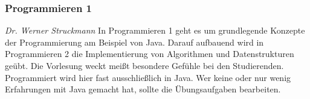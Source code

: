 
\subsubsection{Programmieren 1}
	\textit{Dr. Werner Struckmann}
	In Programmieren 1 geht es um grundlegende Konzepte der Programmierung am Beispiel von Java. Darauf aufbauend wird in Programmieren 2 die Implementierung von Algorithmen und Datenstrukturen geübt. 
	Die Vorlesung weckt meißt besondere Gefühle bei den Studierenden. Programmiert wird hier fast ausschließlich in Java. Wer keine oder nur wenig Erfahrungen mit Java gemacht hat, sollte die Übungsaufgaben bearbeiten.